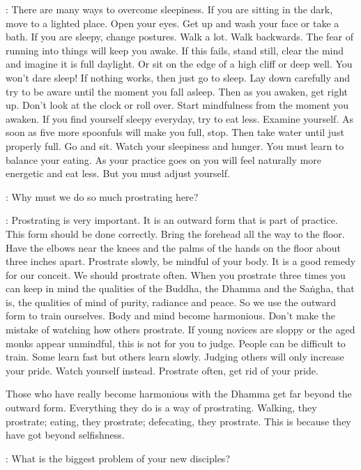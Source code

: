 : There are many ways to overcome sleepiness. If you are sitting in the dark, move to a lighted place. Open your eyes. Get up and wash your face or take a bath. If you are sleepy, change postures. Walk a lot. Walk backwards. The fear of running into things will keep you awake. If this fails, stand still, clear the mind and imagine it is full daylight. Or sit on the edge of a high cliff or deep well. You won't dare sleep! If nothing works, then just go to sleep. Lay down carefully and try to be aware until the moment you fall asleep. Then as you awaken, get right up. Don't look at the clock or roll over. Start mindfulness from the moment you awaken. If you find yourself sleepy everyday, try to eat less. Examine yourself. As soon as five more spoonfuls will make you full, stop. Then take water until just properly full. Go and sit. Watch your sleepiness and hunger. You must learn to balance your eating. As your practice goes on you will feel naturally more energetic and eat less. But you must adjust yourself.

:
Why must we do so much prostrating here?

: Prostrating is very important. It is an outward form that is part of practice. This form should be done correctly. Bring the forehead all the way to the floor. Have the elbows near the knees and the palms of the hands on the floor about three inches apart. Prostrate slowly, be mindful of your body. It is a good remedy for our conceit. We should prostrate often. When you prostrate three times you can keep in mind the qualities of the Buddha, the Dhamma and the Sa\.ngha, that is, the qualities of mind of purity, radiance and peace. So we use the outward form to train ourselves. Body and mind become harmonious. Don't make the mistake of watching how others prostrate. If young novices are sloppy or the aged monks appear unmindful, this is not for you to judge. People can be difficult to train. Some learn fast but others learn slowly. Judging others will only increase your pride. Watch yourself instead. Prostrate often, get rid of your pride.

Those who have really become harmonious with the Dhamma get far beyond the outward form. Everything they do is a way of prostrating. Walking, they prostrate; eating, they prostrate; defecating, they prostrate. This is because they have got beyond selfishness.

:
What is the biggest problem of your new disciples?

